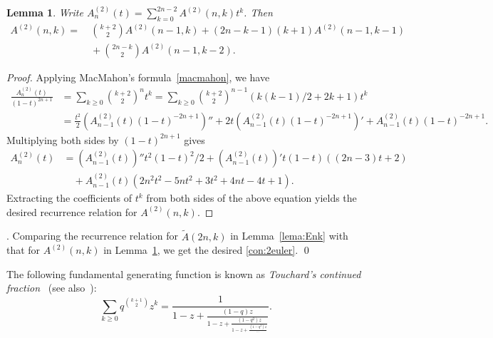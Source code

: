 \documentclass[11pt,reqno]{amsart}
\numberwithin{equation}{section}
\theoremstyle{plain}
\newtheorem{lemma}[theorem]{Lemma}
\theoremstyle{definition}
\begin{document}
\begin{lemma}\label{lema:Ank}
Write $A_n^{(2)}(t)=\sum_{k=0}^{2n-2}A^{(2)}(n,k)t^k$. Then
\begin{align*}
A^{(2)}(n,k)=&\ \binom{k+2}{2}A^{(2)}(n-1,k)+(2n-k-1)(k+1)A^{(2)}(n-1,k-1)\\
&\ +\binom{2n-k}{2}A^{(2)}(n-1,k-2).
\end{align*}
\end{lemma}

\begin{proof}
Applying MacMahon's formula~\eqref{macmahon}, we have
\begin{align*}
\frac{A_n^{(2)}(t)}{(1-t)^{2n+1}}&=\sum_{k\geq 0}\binom{k+2}{2}^n t^k=\sum_{k\geq 0}\binom{k+2}{2}^{n-1}(k(k-1)/2+2k+1) t^k\\
&=\frac{t^2}{2}(A_{n-1}^{(2)}(t)(1-t)^{-2n+1})''+2t(A_{n-1}^{(2)}(t)(1-t)^{-2n+1})'+A_{n-1}^{(2)}(t)(1-t)^{-2n+1}.
\end{align*}
Multiplying both sides by $(1-t)^{2n+1}$ gives
\begin{align*}
A_n^{(2)}(t)&=(A_{n-1}^{(2)}(t))''t^2(1-t)^2/2+(A_{n-1}^{(2)}(t))'t(1-t)((2n-3)t+2)\\
&\quad+A_{n-1}^{(2)}(t)(2n^2t^2-5nt^2+3t^2+4nt-4t+1).
\end{align*}
Extracting the coefficients of $t^k$ from both sides of the above equation yields the desired recurrence relation for $A^{(2)}(n,k)$.
\end{proof}

. Comparing the recurrence relation for $\tilde A(2n,k)$ in Lemma~\ref{lema:Enk} with that for $A^{(2)}(n,k)$ in Lemma~\ref{lema:Ank}, we get the desired \eqref{con:2euler}. \qed

The following fundamental generating function is known as {\em Touchard's
continued fraction}~\cite{Tou} (see also~\cite{Prod}):
$$
\sum_{k\geq0}q^{\binom{k+1}{2}}z^k=\frac{1}{1-z+\displaystyle\frac{(1-q)z}{1-z+\displaystyle\frac{(1-q^2)z}{1-z+\displaystyle\frac{(1-q^3)z}{\cdots}}}}.
$$
\end{document}
